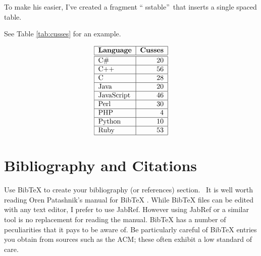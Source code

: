 To make his easier, I've created a fragment \textquotedblleft
sstable\textquotedblright\ that inserts a single spaced table.

See Table \ref{tab:cusses} for an example.

\begin{table}[tb]%
\begin{singlespaced}%

\begin{equation*}
\begin{tabular}{|l|r|}
\hline
\textbf{Language} & \textbf{Cusses} \\ \hline\hline
C\# & 20 \\ \hline
C++ & 56 \\ \hline
C & 28 \\ \hline
Java & 20 \\ \hline
JavaScript & 46 \\ \hline
Perl & 30 \\ \hline
PHP & 4 \\ \hline
Python & 10 \\ \hline
Ruby & 53 \\ \hline
\end{tabular}%
\end{equation*}%
\end{singlespaced}%
\caption{Cuss count by programming language.}%
\label{tab:cusses}%
\end{table}%

\section{Bibliography and Citations}

Use BibTeX to create your bibliography (or references) section. \ It is well
worth reading Oren Patashnik's manual for BibTeX \cite{Patashnik-1988}.
While BibTeX files can be edited with any text editor, I prefer to use
JabRef. However using JabRef or a similar tool is no replacement for reading
the manual. BibTeX has a number of peculiarities that it pays to be aware
of. Be particularly careful of BibTeX entries you obtain from sources such
as the ACM; these often exhibit a low standard of care.

